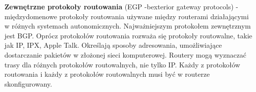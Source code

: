 \documentclass[a4paper]{article}
\begin{document}
\textbf{Zewnętrzne protokoły routowania} (EGP -bexterior gateway protocols) - międzydomenowe protokoły routowania używane między routerami działającymi w różnych systemach autonomicznych.
Najważniejszym protokołem zewnętrznym jest BGP.
Oprócz protokołów routowania rozważa się protokoły routowalne, takie jak IP, IPX, Apple
Talk. Określają sposoby adresowania, umożliwiające dostarczanie
pakietów w złożonej sieci komputerowej. Routery mogą wyznaczać trasy dla różnych
protokołów routowalnych, nie tylko IP. Każdy z protokołów routowania i każdy z protokołów
routowalnych musi być w routerze skonfigurowany.
\end{document}
